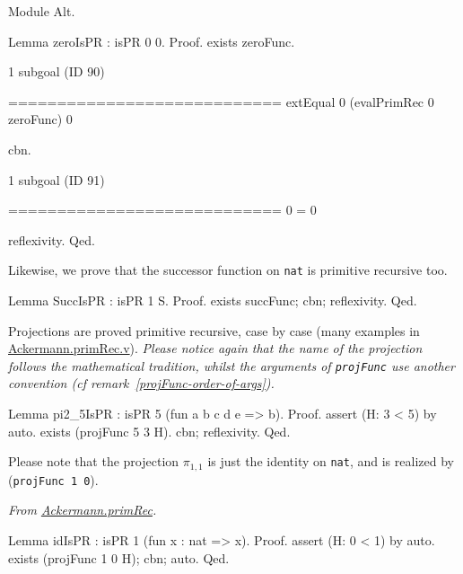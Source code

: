 \begin{Coqsrc}
Module Alt.
  
Lemma zeroIsPR : isPR 0 0.
Proof.
  exists zeroFunc.
\end{Coqsrc}

\begin{Coqanswer}
1 subgoal (ID 90)
  
  ============================
  extEqual 0 (evalPrimRec 0 zeroFunc) 0
\end{Coqanswer}

\begin{Coqsrc}
  cbn.
\end{Coqsrc}


\begin{Coqanswer}
1 subgoal (ID 91)
  
  ============================
  0 = 0
\end{Coqanswer}

\begin{Coqsrc}
  reflexivity.
Qed.
\end{Coqsrc}


Likewise, we prove that the successor function on \texttt{nat} is primitive recursive too.

\begin{Coqsrc}
Lemma SuccIsPR : isPR 1 S.
Proof.
  exists succFunc; cbn; reflexivity.
Qed.
\end{Coqsrc}

Projections are proved primitive recursive, case by case (many examples in 
\href{../theories/html/hydras.Ackermann.primRec.html}{Ackermann.primRec.v}).
\emph{Please notice again that the name of the projection follows the mathematical tradition, 
whilst the arguments of  \texttt{projFunc} use another convention (\emph{cf} remark~\vref{projFunc-order-of-args}).}

\begin{Coqsrc}
Lemma pi2_5IsPR : isPR 5 (fun a b c d e => b).
Proof.
 assert (H: 3 < 5) by auto.
 exists (projFunc 5 3 H).
 cbn; reflexivity.
Qed.
\end{Coqsrc}

Please note that the projection $\pi_{1,1}$ is just the identity on \texttt{nat}, and is realized by 
(\texttt{projFunc 1 0}).


\vspace{4pt}
\noindent
\emph{From \href{../theories/html/hydras.Ackermann.primRec.html}{Ackermann.primRec}.}

\begin{Coqsrc}
Lemma idIsPR : isPR 1 (fun x : nat => x).
Proof.
  assert (H: 0 < 1) by auto.
  exists (projFunc 1 0 H); cbn; auto.
Qed.
\end{Coqsrc}

